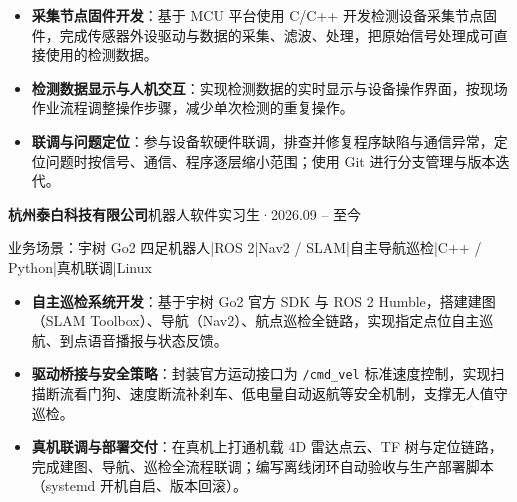 \documentclass[10pt,a4paper]{article}
\begin{document}
\vspace{2pt}

\begin{itemize}[leftmargin=1.5em, itemsep=1pt, parsep=0pt, topsep=2pt]
    \item \textbf{采集节点固件开发}：基于 MCU 平台使用 C/C++ 开发检测设备采集节点固件，完成传感器外设驱动与数据的采集、滤波、处理，把原始信号处理成可直接使用的检测数据。
    \item \textbf{检测数据显示与人机交互}：实现检测数据的实时显示与设备操作界面，按现场作业流程调整操作步骤，减少单次检测的重复操作。
    \item \textbf{联调与问题定位}：参与设备软硬件联调，排查并修复程序缺陷与通信异常，定位问题时按信号、通信、程序逐层缩小范围；使用 Git 进行分支管理与版本迭代。
\end{itemize}

\vspace{0.2em}

{\bfseries 杭州泰白科技有限公司}\hfill{\color{graytext}机器人软件实习生\hspace{0.3em}·\hspace{0.3em}2026.09 -- 至今}

{\small\color{graytext}业务场景：宇树 Go2 四足机器人\hspace{0.3em}|\hspace{0.3em}ROS 2\hspace{0.3em}|\hspace{0.3em}Nav2 / SLAM\hspace{0.3em}|\hspace{0.3em}自主导航巡检\hspace{0.3em}|\hspace{0.3em}C++ / Python\hspace{0.3em}|\hspace{0.3em}真机联调\hspace{0.3em}|\hspace{0.3em}Linux}

\vspace{2pt}

\begin{itemize}[leftmargin=1.5em, itemsep=1pt, parsep=0pt, topsep=2pt]
    \item \textbf{自主巡检系统开发}：基于宇树 Go2 官方 SDK 与 ROS 2 Humble，搭建建图（SLAM Toolbox）、导航（Nav2）、航点巡检全链路，实现指定点位自主巡航、到点语音播报与状态反馈。
    \item \textbf{驱动桥接与安全策略}：封装官方运动接口为 \texttt{/cmd\_vel} 标准速度控制，实现扫描断流看门狗、速度断流补刹车、低电量自动返航等安全机制，支撑无人值守巡检。
    \item \textbf{真机联调与部署交付}：在真机上打通机载 4D 雷达点云、TF 树与定位链路，完成建图、导航、巡检全流程联调；编写离线闭环自动验收与生产部署脚本（systemd 开机自启、版本回滚）。
\end{itemize}
\end{document}
